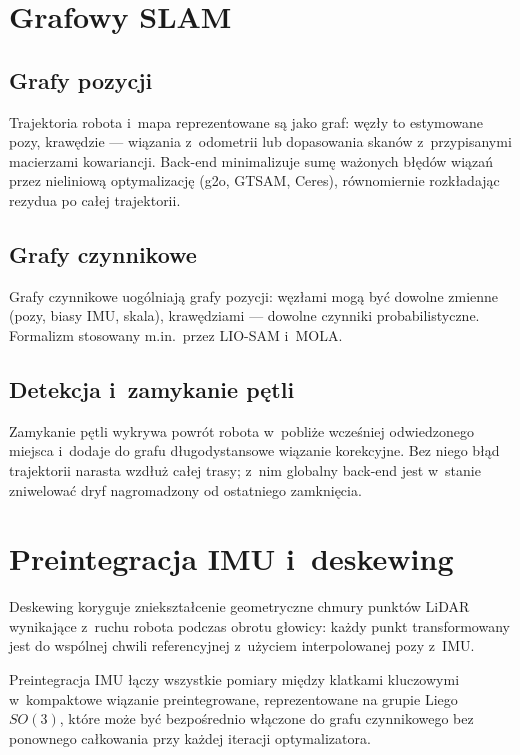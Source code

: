 \section{Grafowy SLAM}

\subsection{Grafy pozycji}

Trajektoria robota i~mapa reprezentowane są jako graf: węzły to estymowane
pozy, krawędzie --- wiązania z~odometrii lub dopasowania skanów z~przypisanymi
macierzami kowariancji.
Back-end minimalizuje sumę ważonych błędów wiązań przez nieliniową optymalizację
(g2o, GTSAM, Ceres), równomiernie rozkładając rezydua po całej trajektorii.

\subsection{Grafy czynnikowe}

Grafy czynnikowe uogólniają grafy pozycji: węzłami mogą być dowolne zmienne
(pozy, biasy IMU, skala), krawędziami --- dowolne czynniki probabilistyczne.
Formalizm stosowany m.in.\ przez LIO-SAM i~MOLA.

\subsection{Detekcja i~zamykanie pętli}

Zamykanie pętli wykrywa powrót robota w~pobliże wcześniej odwiedzonego miejsca
i~dodaje do grafu długodystansowe wiązanie korekcyjne.
Bez niego błąd trajektorii narasta wzdłuż całej trasy; z~nim globalny
back-end jest w~stanie zniwelować dryf nagromadzony od ostatniego zamknięcia.

\section{Preintegracja IMU i~deskewing}

Deskewing koryguje zniekształcenie geometryczne chmury punktów LiDAR
wynikające z~ruchu robota podczas obrotu głowicy: każdy punkt transformowany
jest do wspólnej chwili referencyjnej z~użyciem interpolowanej pozy z~IMU.

Preintegracja IMU łączy wszystkie pomiary między klatkami kluczowymi
w~kompaktowe wiązanie preintegrowane, reprezentowane na grupie Liego $SO(3)$,
które może być bezpośrednio włączone do grafu czynnikowego bez ponownego
całkowania przy każdej iteracji optymalizatora.

